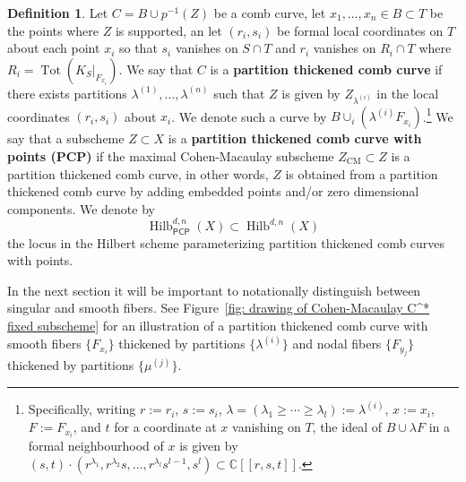 \documentclass[12pt]{amsart}
\theoremstyle{definition}
\newtheorem{definition}[theorem]{Definition}
\newcommand{\CC} {\mathbb{C}}          %
\newcommand{\Hilb}{\operatorname{Hilb}}
\newcommand{\Tot}{\operatorname{Tot}}
\newcommand{\CM}{\operatorname{CM}}
\newcommand{\PCP}{\mathsf{PCP}}
\begin{document}
\begin{definition}\label{defn: partition thickened comb curve}
Let $C=B\cup p^{-1}(Z)$ be a comb curve, let $x_{1},\dotsc ,x_{n}\in
B\subset T$ be the points where $Z$ is supported, an let
$(r_{i},s_{i})$ be formal local coordinates on $T$ about each point
$x_{i}$ so that $s_{i}$ vanishes on $S\cap T$ and $r_{i}$
vanishes on $R_{i}\cap T$ where $R_{i}=\Tot (K_{S}|_{F_{x_{i}}})$. We
say that $C$ is a \textbf{partition thickened comb curve} if there
exists partitions $\lambda^{(1)},\dotsc ,\lambda^{(n)}$ such that $Z$
is given by $Z_{\lambda^{(i)}}$ in the local coordinates
$(r_{i},s_{i})$ about $x_{i}$.
We denote such a curve by
$B\cup_{i}\left(\lambda^{(i)}F_{x_{i}} \right)$.\footnote{Specifically, writing $r:=r_i$, $s:=s_i$, $\lambda = (\lambda_1 \geq \cdots \geq \lambda_l):=\lambda^{(i)}$, $x:=x_i$, $F:=F_{x_i}$, and $t$ for a coordinate at $x$ vanishing on $T$, the ideal of $B \cup \lambda F$ in a formal neighbourhood of $x$ is given by $(s,t) \cdot (r^{\lambda_{1}},r^{\lambda_{2}}s,\dotsc ,r^{\lambda_{l}}s^{l-1},s^{l}) \subset \CC[[r,s,t]]$.} We say that a
subscheme $Z\subset X$ is a \textbf{partition thickened comb curve
with points (PCP)} if the maximal Cohen-Macaulay subscheme
$Z_{\CM}\subset Z$ is a partition thickened comb curve, in other words,
$Z$ is obtained from a partition thickened comb curve by adding
embedded points and/or zero dimensional components. We denote by
\[
\Hilb^{d,n}_{\PCP}(X)\subset \Hilb^{d,n}(X)
\]
the locus in the Hilbert scheme parameterizing partition thickened
comb curves with points.
\end{definition}

In the next section it will be important to notationally distinguish
between singular and smooth fibers. See Figure~\ref{fig: drawing of
Cohen-Macaulay C^* fixed subscheme} for an illustration of a partition
thickened comb curve with smooth fibers $\{F_{x_{i}} \}$ thickened by
partitions $\{\lambda^{(i)} \}$ and nodal fibers  $\{F_{y_{j}} \}$ thickened by
partitions $\{\mu^{(j)} \}$.
\end{document}
